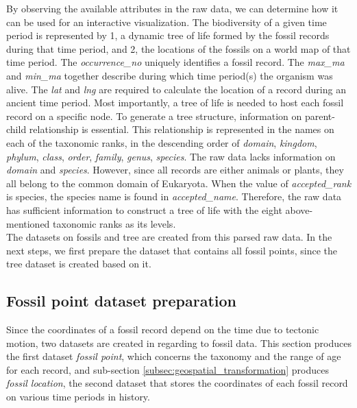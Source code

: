 \documentclass[11pt, a4paper,oneside,chapterprefix=false]{scrbook}
\begin{document}
By observing the available attributes in the raw data, we can determine how it can be used for an interactive visualization. The biodiversity of a given time period is represented by 1, a dynamic tree of life formed by the fossil records during that time period, and 2, the locations of the fossils on a world map of that time period. The \emph{occurrence\_no} uniquely identifies a fossil record. The \emph{max\_ma} and \emph{min\_ma} together describe during which time period(s) the organism was alive. The \emph{lat} and \emph{lng} are required to calculate the location of a record during an ancient time period. Most importantly, a tree of life is needed to host each fossil record on a specific node. To generate a tree structure, information on parent-child relationship is essential. This relationship is represented in the names on each of the taxonomic ranks, in the descending order of \emph{domain}, \emph{kingdom}, \emph{phylum}, \emph{class}, \emph{order}, \emph{family}, \emph{genus}, \emph{species}. The raw data lacks information on \emph{domain} and \emph{species}. However, since all records are either animals or plants, they all belong to the common domain of Eukaryota. When the value of \emph{accepted\_rank} is species, the species name is found in \emph{accepted\_name}. Therefore, the raw data has sufficient information to construct a tree of life with the eight above-mentioned taxonomic ranks as its levels.\\

The datasets on fossils and tree are created from this parsed raw data. In the next steps, we first prepare the dataset that contains all fossil points, since the tree dataset is created based on it. 

\subsection{Fossil point dataset preparation}
\label{subsec:fossil_preparation}
Since the coordinates of a fossil record depend on the time due to tectonic motion, two datasets are created in regarding to fossil data. This section produces the first dataset \emph{fossil point}, which concerns the taxonomy and the range of age for each record, and sub-section \ref{subsec:geospatial_transformation} produces \emph{fossil location}, the second dataset that stores the coordinates of each fossil record on various time periods in history. \\
\end{document}
